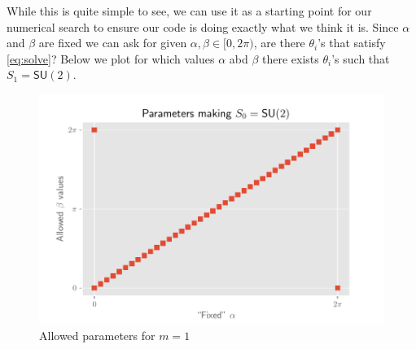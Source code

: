 \documentclass[12pt,dvipsnames]{article}
\newcommand{\SU}[1]{\mathsf{SU} (#1)}
\newcommand{\1}{\mathbb{1}}
\theoremstyle{plain}
\begin{document}
While this is quite simple to see, we can use it as a starting point for our numerical search to ensure our code is doing exactly what we think it is. Since $\alpha$ and $\beta$ are fixed we can ask for given $\alpha, \beta\in[0, 2\pi)$, are there $\theta_i$'s that satisfy \cref{eq:solve}? Below we plot for which values $\alpha$ abd $\beta$ there exists $\theta_i$'s such that $S_1 = \SU{2}$.
\begin{figure}[h]
    \begin{minipage}[c]{0.7\textwidth}
        \includegraphics[width=\textwidth]{../su2/s0.pdf}
    \end{minipage}\hfill
    \begin{minipage}[c]{0.3\textwidth}
        \caption{Allowed parameters for $m = 1$}\label{fig:m=1}
    \end{minipage}
\end{figure}
\end{document}
